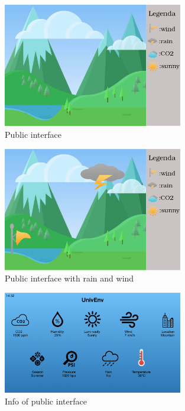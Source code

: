 \documentclass[12pt]{article} %
\begin{document}
\begin{itemize}
\begin{figure}[H]
  \centering
  \includegraphics[width=0.7\textwidth]{img/default.png}
  \caption{Public interface}
  \label{fig:boat1}
\end{figure}
\begin{figure}[H]
  \centering
  \includegraphics[width=0.7\textwidth]{img/wind+rain.png}
  \caption{Public interface with rain and wind}
  \label{fig:boat1}
\end{figure}
\begin{figure}[H]
  \centering
  \includegraphics[width=0.7\textwidth]{img/p2.png}
  \caption{Info of public interface}
  \label{fig:boat2}
\end{figure}
\end{itemize}
\newpage
\end{document}
